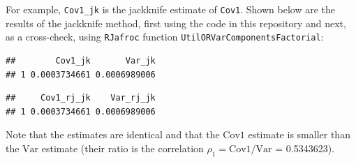 \documentclass[
]{book}
\newenvironment{Shaded}{\begin{snugshade}}{\end{snugshade}}
\newcommand{\CommentTok}[1]{\textcolor[rgb]{0.56,0.35,0.01}{\textit{#1}}}
\newcommand{\DataTypeTok}[1]{\textcolor[rgb]{0.13,0.29,0.53}{#1}}
\newcommand{\KeywordTok}[1]{\textcolor[rgb]{0.13,0.29,0.53}{\textbf{#1}}}
\newcommand{\NormalTok}[1]{#1}
\newcommand{\OperatorTok}[1]{\textcolor[rgb]{0.81,0.36,0.00}{\textbf{#1}}}
\newcommand{\StringTok}[1]{\textcolor[rgb]{0.31,0.60,0.02}{#1}}
\begin{document}
For example, \texttt{Cov1\_jk} is the jackknife estimate of \texttt{Cov1}. Shown below are the results of the jackknife method, first using the code in this repository and next, as a cross-check, using \texttt{RJafroc} function \texttt{UtilORVarComponentsFactorial}:

\begin{Shaded}
\end{Shaded}

\begin{verbatim}
##        Cov1_jk       Var_jk
## 1 0.0003734661 0.0006989006
\end{verbatim}

\begin{Shaded}
\end{Shaded}

\begin{verbatim}
##     Cov1_rj_jk    Var_rj_jk
## 1 0.0003734661 0.0006989006
\end{verbatim}

Note that the estimates are identical and that the \(\text{Cov1}\) estimate is smaller than the \(\text{Var}\) estimate (their ratio is the correlation \(\rho_1 = \text{Cov1}/\text{Var}\) = 0.5343623).
\end{document}
